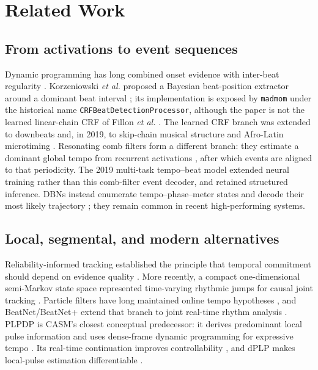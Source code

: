 \documentclass{article}
\begin{document}
\section{Related Work}
\label{sec:related}

\subsection{From activations to event sequences}

Dynamic programming has long combined onset evidence with inter-beat
regularity \cite{ellis2007beattracking}. Korzeniowski \emph{et al.} proposed a
Bayesian beat-position extractor around a dominant beat interval
\cite{korzeniowski2014crf}; its implementation is exposed by \texttt{madmom}
under the historical name \texttt{CRFBeatDetectionProcessor}, although the
paper is not the learned linear-chain CRF of Fillon \emph{et al.}
\cite{fillon2015crf}. The learned CRF branch was extended to downbeats
\cite{durand2016crfdownbeat} and, in 2019, to skip-chain musical structure and
Afro-Latin microtiming \cite{fuentes2019skipchain,fuentes2019microtiming}.
Resonating comb filters form a different branch: they estimate a dominant
global tempo from recurrent activations \cite{bock2015combfilter}, after which
events are aligned to that periodicity. The 2019 multi-task tempo--beat model
\cite{bock2019multitask} extended neural training rather than this comb-filter
event decoder, and retained structured inference. DBNs instead enumerate
tempo--phase--meter states and decode their most likely trajectory
\cite{krebs2015dbn,bock2016joint}; they remain common in recent high-performing
systems.

\subsection{Local, segmental, and modern alternatives}

Reliability-informed tracking established the principle that temporal
commitment should depend on evidence quality \cite{degara2012reliability}.
More recently, a compact one-dimensional semi-Markov state space represented
time-varying rhythmic jumps for causal joint tracking
\cite{heydari2022semimarkov}. Particle filters have long maintained online
tempo hypotheses \cite{hainsworth2004particle}, and BeatNet/BeatNet+ extend
that branch to joint real-time rhythm analysis
\cite{heydari2021beatnet,heydari2024beatnetplus}.
PLPDP is CASM's closest conceptual predecessor: it derives predominant local
pulse information and uses dense-frame dynamic programming for expressive
tempo \cite{chiu2023localperiodicity}. Its real-time continuation improves
controllability \cite{meier2024realtime}, and dPLP makes local-pulse estimation
differentiable \cite{chiu2025dplp}.
\end{document}
